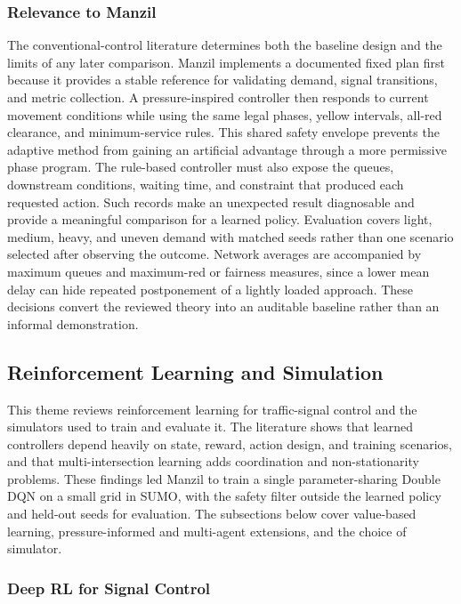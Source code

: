 \subsubsection{Relevance to Manzil}

The conventional-control literature determines both the baseline design and the limits of any later comparison. Manzil implements a documented fixed plan first because it provides a stable reference for validating demand, signal transitions, and metric collection. A pressure-inspired controller then responds to current movement conditions while using the same legal phases, yellow intervals, all-red clearance, and minimum-service rules. This shared safety envelope prevents the adaptive method from gaining an artificial advantage through a more permissive phase program. The rule-based controller must also expose the queues, downstream conditions, waiting time, and constraint that produced each requested action. Such records make an unexpected result diagnosable and provide a meaningful comparison for a learned policy. Evaluation covers light, medium, heavy, and uneven demand with matched seeds rather than one scenario selected after observing the outcome. Network averages are accompanied by maximum queues and maximum-red or fairness measures, since a lower mean delay can hide repeated postponement of a lightly loaded approach. These decisions convert the reviewed theory into an auditable baseline rather than an informal demonstration.

\subsection{Reinforcement Learning and Simulation}

This theme reviews reinforcement learning for traffic-signal control and the simulators used to train and evaluate it. The literature shows that learned controllers depend heavily on state, reward, action design, and training scenarios, and that multi-intersection learning adds coordination and non-stationarity problems. These findings led Manzil to train a single parameter-sharing Double DQN on a small grid in SUMO, with the safety filter outside the learned policy and held-out seeds for evaluation. The subsections below cover value-based learning, pressure-informed and multi-agent extensions, and the choice of simulator.

\subsubsection{Deep RL for Signal Control}

